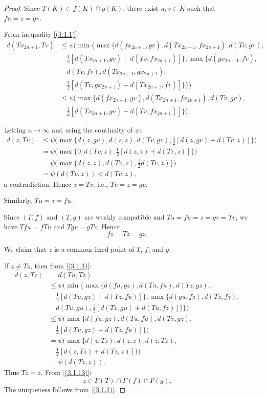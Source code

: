 \documentclass[10pt,a4paper]{amsart}
\begin{document}
\begin{proof}
Since $\overline{T(K)} \subset f(K) \cap g(K)$, there exist $u,v \in K$ such that $fu = z = gv$.

From inequality \eqref{(3.1.1)}:
\begin{align*}
d(Tx_{2n+1},Tv) &\leq \psi\Big(\min\Big\{\max\big\{d(fx_{2n+1},gv), d(Tx_{2n+1},fx_{2n+1}), d(Tv,gv), \\
&\quad \tfrac{1}{2}[d(Tx_{2n+1},gv) + d(Tv,fx_{2n+1})]\big\}, \max\big\{d(gx_{2n+1},fv), \\
&\quad d(Tv,fv), d(Tx_{2n+1},gx_{2n+1}), \\
&\quad \tfrac{1}{2}[d(Tv,gx_{2n+1}) + d(Tx_{2n+1},fv)]\big\}\Big\}\Big)\\
&\leq \psi\Big(\max\big\{d(fx_{2n+1},gv), d(Tx_{2n+1},fx_{2n+1}), d(Tv,gv), \\
&\quad \tfrac{1}{2}[d(Tx_{2n+1},gv) + d(Tv,fx_{2n+1})]\big\}\Big).
\end{align*}

Letting $n\to\infty$ and using the continuity of $\psi$:
\begin{align*}
d(z,Tv) &\leq \psi\Big(\max\big\{d(z,gv), d(z,z), d(Tv,gv), \tfrac{1}{2}[d(z,gv) + d(Tv,z)]\big\}\Big) \\
&= \psi\Big(\max\big\{0, d(Tv,z), \tfrac{1}{2}[d(z,z) + d(Tv,z)]\big\}\Big) \\
&= \psi\Big(\max\big\{d(z,z), d(Tv,z), \tfrac{1}{2}d(Tv,z)\big\}\Big) \\
&= \psi(d(Tv,z)) < d(Tv,z),
\end{align*}
a contradiction. Hence $z=Tv$, i.e., $Tv=z=gv$.

Similarly, $Tu=z=fu$.

Since $(T,f)$ and $(T,g)$ are weakly compatible and $Tu=fu=z=gv=Tv$, we have $Tfu=fTu$ and $Tgv=gTv$. Hence
\begin{equation}\label{(3.1.13)}
fz = Tz = gz.
\end{equation}

We claim that $z$ is a common fixed point of $T$, $f$, and $g$.

If $z \neq Tz$, then from \eqref{(3.1.1)}:
\begin{align*}
d(z,Tz) &= d(Tu,Tz) \\
&\leq \psi\Big(\min\Big\{\max\big\{d(fu,gz), d(Tu,fu), d(Tz,gz), \\
&\quad \tfrac{1}{2}[d(Tu,gz) + d(Tz,fu)]\big\}, \max\big\{d(gu,fz), d(Tz,fz), \\
&\quad d(Tu,gu), \tfrac{1}{2}[d(Tz,gu) + d(Tu,fz)]\big\}\Big\}\Big) \\
&\leq \psi\Big(\max\big\{d(fu,gz), d(Tu,fu), d(Tv,gz), \\
&\quad \tfrac{1}{2}[d(Tu,gz) + d(Tz,fu)]\big\}\Big) \\
&= \psi\Big(\max\big\{d(z,Tz), d(z,z), d(z,Tz), \\
&\quad \tfrac{1}{2}[d(z,Tz) + d(Tz,z)]\big\}\Big) \\
&= \psi(d(Tz,z)).
\end{align*}
Thus $Tz=z$.
From \eqref{(3.1.13)}:
\[
z \in F(T) \cap F(f) \cap F(g).
\]
The uniqueness follows from \eqref{(3.1.1)}.


\end{proof}
\end{document}
